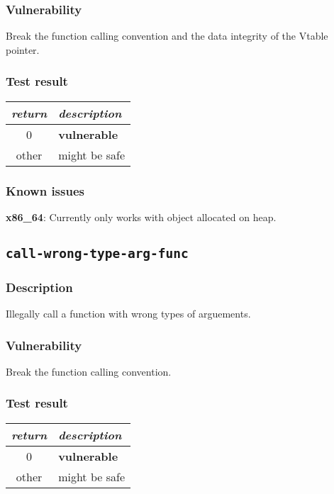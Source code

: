 \documentclass[a4paper]{book}
\begin{document}
\subsubsection{Vulnerability}
Break the function calling convention and the data integrity of the Vtable pointer.

\subsubsection{Test result}
\begin{tabular}{cl}
  \toprule
  \emph{return}  & \emph{description} \\
  \midrule
  0              & \textbf{vulnerable} \\
  other          & might be safe \\
  \bottomrule
\end{tabular}

\subsubsection{Known issues}
\textbf{x86\_64}: Currently only works with object allocated on heap.

\newpage

\subsection{\texttt{call-wrong-type-arg-func}}\label{test-call-wrong-type-arg-func}

\subsubsection{Description}
Illegally call a function with wrong types of arguements.

\subsubsection{Vulnerability}
Break the function calling convention.

\subsubsection{Test result}
\begin{tabular}{cl}
  \toprule
  \emph{return}  & \emph{description} \\
  \midrule
  0              & \textbf{vulnerable} \\
  other          & might be safe \\
  \bottomrule
\end{tabular}
\end{document}
